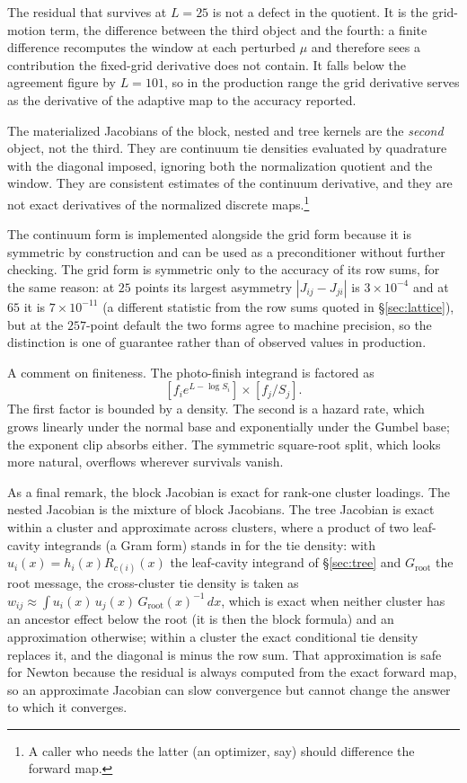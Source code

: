 \documentclass[11pt]{article}
\begin{document}
The residual that survives at $L=25$ is not a defect
in the quotient. It is the grid-motion term, the difference between the
third object and the fourth: a finite difference recomputes the window at
each perturbed $\mu$ and therefore sees a contribution the fixed-grid
derivative does not contain. It falls below the agreement figure by
$L=101$, so in the production range the grid derivative serves as the
derivative of the adaptive map to the accuracy reported.

The materialized Jacobians of the block, nested and tree kernels are
the \emph{second} object, not the third. They are continuum tie densities
evaluated by quadrature with the diagonal imposed, ignoring both the
normalization quotient and the window. They are consistent estimates of
the continuum derivative, and they are not exact derivatives of the
normalized discrete maps.\footnote{A caller who needs the
latter (an optimizer, say) should difference the forward map.}

The continuum form is implemented alongside the grid form because it is
symmetric by construction and can be used as a preconditioner without
further checking. The grid form is symmetric only to the accuracy of its
row sums, for the same reason: at $25$ points its largest asymmetry
$|J_{ij}-J_{ji}|$ is
$3\times10^{-4}$ and at $65$ it is $7\times10^{-11}$ (a different
statistic from the row sums quoted in \S\ref{sec:lattice}), but at the $257$-point
default the two forms agree to machine precision, so the distinction is
one of guarantee rather than of observed values in production.

A comment on finiteness. The photo-finish integrand is
factored as $$[f_i e^{L-\log S_i}]\times[f_j/S_j].$$ The first factor is
bounded by a density. The second is a hazard rate, which grows linearly
under the normal base and exponentially under the Gumbel base; the
exponent clip absorbs either. The symmetric square-root split, which
looks more natural, overflows wherever survivals vanish.

As a final remark, the block Jacobian is exact for
rank-one cluster loadings. The nested Jacobian is the
mixture of block Jacobians. The tree Jacobian is exact within a cluster
and approximate across clusters, where a product of two leaf-cavity
integrands (a Gram form) stands in for the tie density: with $u_i(x)=h_i(x)R_{c(i)}(x)$ the
leaf-cavity integrand of \S\ref{sec:tree} and $G_{\mathrm{root}}$ the
root message, the cross-cluster tie density is taken as
$w_{ij}\approx\int u_i(x)\,u_j(x)\,G_{\mathrm{root}}(x)^{-1}\,dx$, which is
exact when neither cluster has an ancestor effect below the root (it
is then the block formula) and an approximation otherwise; within a
cluster the exact conditional tie density replaces it, and the diagonal
is minus the row sum. That approximation is safe for
Newton because the residual is always computed from the exact forward
map, so an approximate Jacobian can slow convergence but cannot change the
answer to which it converges.
\end{document}
